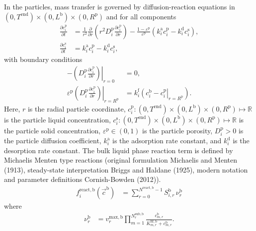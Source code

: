 \documentclass{article}
\begin{document}
In the particles, mass transfer is governed by diffusion-reaction equations in $(0, T^{\mathrm{end}}) \times (0, L^{\mathrm{b}})\times (0, R^{\mathrm{p}})$ and for all components
\begin{align}
    \frac{\partial c^{\mathrm{p}}_{i}}{\partial t}
    &= \frac{1}{r^{2}} \frac{\partial }{\partial r} \left( r^{2} D^{\mathrm{p}}_{i} \frac{\partial c^{\mathrm{p}}_{i}}{\partial r} \right)
        - \frac{1 - \varepsilon^{\mathrm{p}}}{\varepsilon^{\mathrm{p}}}\left(k^{\mathrm{a}}_{i} c^{\mathrm{p}}_{i} - k^{\mathrm{d}}_{i} c^{\mathrm{s}}_{i} \right),
    \\
    \frac{\partial c^{\mathrm{s}}_{i}}{\partial t}
    &= k^{\mathrm{a}}_{i} c^{\mathrm{p}}_{i}
        - k^{\mathrm{d}}_{i} c^{\mathrm{s}}_{i},
\end{align}
with boundary conditions
\begin{align}
    - \left. \left( D^{\mathrm{p}}_{i} \frac{\partial c^{\mathrm{p}}_{i}}{\partial r} \right) \right|_{r=0}
    &= 0,
    \\
    \varepsilon^{\mathrm{p}} \left. \left( D^{\mathrm{p}}_{i} \frac{\partial c^{\mathrm{p}}_{i}}{\partial r} \right)\right|_{r = R^{\mathrm{p}}}
    &= k^{\mathrm{f}}_{i} \left. \left( c^{\mathrm{b}}_{i} - c^{\mathrm{p}}_{i} \right|_{r = R^{\mathrm{p}}} \right).
\end{align}
Here, $r$ is the radial particle coordinate, $c^{\mathrm{p}}_{i}\colon (0, T^{\mathrm{end}}) \times (0, L^{\mathrm{b}})\times (0, R^{\mathrm{p}}) \mapsto \mathbb{R}$ is the particle liquid concentration, $c^{\mathrm{s}}_{i}\colon (0, T^{\mathrm{end}}) \times (0, L^{\mathrm{b}})\times (0, R^{\mathrm{p}}) \mapsto \mathbb{R}$ is the particle solid concentration, $\varepsilon^{\mathrm{p}}\in (0, 1)$ is the particle porosity, $D^{\mathrm{p}}_{i}> 0$ is the particle diffusion coefficient, $k^{\mathrm{a}}_{i}$ is the adsorption rate constant, and $k^{\mathrm{d}}_{i}$ is the desorption rate constant.
The bulk liquid phase reaction term is defined by Michaelis Menten type reactions (original formulation Michaelis and Menten (1913), steady-state interpretation Briggs and Haldane (1925), modern notation and parameter definitions Cornish-Bowden (2012)).
\begin{align}
    f^{\mathrm{react},\mathrm{b}}_{i}\left( \vec{c}^{\mathrm{b}} \right)
    &= \sum_{r=0}^{N^{\mathrm{react},\mathrm{b}}-1} S^{\mathrm{b}}_{i,r} \,\nu^{\mathrm{b}}_{r}
\end{align}
where
\begin{align}
    \nu^{\mathrm{b}}_{r}
    &= v^{\mathrm{max},\mathrm{b}}_{r} \prod_{m=1}^{N^{\mathrm{sub},\mathrm{b}}_{r}} \frac{c^{\mathrm{b}}_{m,r}}{K^{\mathrm{M},\mathrm{b}}_{m,r} + c^{\mathrm{b}}_{m,r}}.
\end{align}
\end{document}
